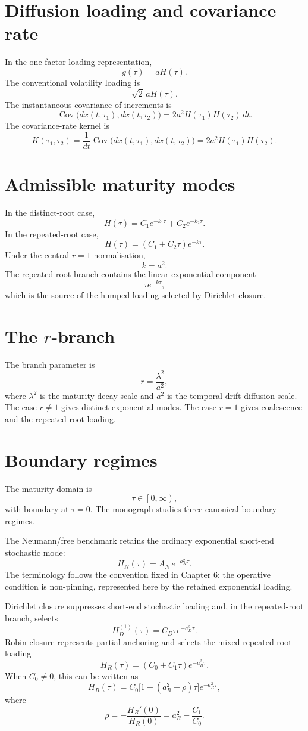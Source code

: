 \documentclass[11pt,oneside]{book}
\begin{document}
\section{Diffusion loading and covariance rate}
In the one-factor loading representation,
\[
g(\tau)=aH(\tau).
\]
The conventional volatility loading is
\[
\sqrt{2}\,aH(\tau).
\]
The instantaneous covariance of increments is
\[
\operatorname{Cov}\bigl(dx(t,\tau_1),dx(t,\tau_2)\bigr)
=
2a^2H(\tau_1)H(\tau_2)\,dt.
\]
The covariance-rate kernel is
\[
K(\tau_1,\tau_2)
=
\frac{1}{dt}\operatorname{Cov}\bigl(dx(t,\tau_1),dx(t,\tau_2)\bigr)
=
2a^2H(\tau_1)H(\tau_2).
\]

\section{Admissible maturity modes}
In the distinct-root case,
\[
H(\tau)=C_1e^{-k_1\tau}+C_2e^{-k_2\tau}.
\]
In the repeated-root case,
\[
H(\tau)=(C_1+C_2\tau)e^{-k\tau}.
\]
Under the central \(r=1\) normalisation,
\[
k=a^2.
\]
The repeated-root branch contains the linear-exponential component
\[
\tau e^{-k\tau},
\]
which is the source of the humped loading selected by Dirichlet closure.

\section{The \texorpdfstring{\(r\)}{r}-branch}
The branch parameter is
\[
r=\frac{\lambda^2}{a^2},
\]
where \(\lambda^2\) is the maturity-decay scale and \(a^2\) is the temporal drift-diffusion scale.  The case \(r\neq1\) gives distinct exponential modes. The case \(r=1\) gives coalescence and the repeated-root loading.

\section{Boundary regimes}
The maturity domain is
\[
\tau\in\left[0,\infty\right),
\]
with boundary at \(\tau=0\). The monograph studies three canonical boundary regimes.

The Neumann/free benchmark retains the ordinary exponential short-end stochastic mode:
\[
H_N(\tau)=A_N\,e^{-a_N^2\tau}.
\]
The terminology follows the convention fixed in Chapter 6: the operative condition is non-pinning, represented here by the retained exponential loading.

Dirichlet closure suppresses short-end stochastic loading and, in the repeated-root branch, selects
\[
H_D^{(1)}(\tau)=C_D\tau e^{-a_D^2\tau}.
\]
Robin closure represents partial anchoring and selects the mixed repeated-root loading
\[
H_R(\tau)=(C_0+C_1\tau)e^{-a_R^2\tau}.
\]
When \(C_0\neq0\), this can be written as
\[
H_R(\tau)
=
C_0\bigl[1+(a_R^2-\rho)\tau\bigr]e^{-a_R^2\tau},
\]
where
\[
\rho=-\frac{H_R'(0)}{H_R(0)}=a_R^2-\frac{C_1}{C_0}.
\]
\end{document}
